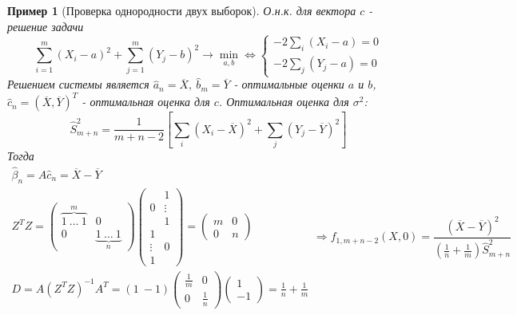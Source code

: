 \documentclass[12pt]{article}
\newtheorem*{example}{Пример}
\theoremstyle{basic_theorem}
\theoremstyle{name_theorem}
\begin{document}
\begin{example}[Проверка однородности двух выборок]
    О.н.к. для вектора $c$ - решение задачи
    \[
        \sum_{i=1}^m(X_i-a)^2+\sum_{j=1}^m(Y_j-b)^2\rightarrow \min_{a, b}
        \Leftrightarrow \begin{cases}
            -2\sum_i(X_i-a) = 0 \\
            -2\sum_j(Y_j-a) = 0
        \end{cases}
    \]
    Решением системы является $\widehat{a}_n=\overline{X},\ \widehat{b}_m=\overline{Y}$ -
    оптимальные оценки $a$ и $b$, $\widehat{c}_n=(\overline{X}, \overline{Y})^T$ - оптимальная
    оценка для $c$. Оптимальная оценка для $\sigma^2$:
    \[ \widehat{S}^2_{m+n}=\frac{1}{m+n-2}\left[\sum_i(X_i-\overline{X})^2+\sum_j(Y_j-\overline{Y})^2\right] \]
    Тогда
    \[
    \begin{array}{l}
        \widehat{\beta}_n=A\widehat{c}_n=\overline{X}-\overline{Y} \\
        Z^TZ=\left(\begin{array}{cc}
            \overbrace{1\ \ldots\ 1}^m & 0 \\
                  0      & \underbrace{1\ \ldots\ 1}_n
        \end{array}\right)
        \left(\begin{array}{cc}
              & 1 \\
            0 & \vdots \\
              & 1 \\
            1  & \\
            \vdots & 0 \\
            1  &
        \end{array}\right) = \left(\begin{array}{cc}
            m & 0 \\
            0 & n
        \end{array}\right) \\
        D=A(Z^TZ)^{-1}A^T=
        \left(1\ -1 \right)
        \left(\begin{array}{cc}
            \frac{1}{m} & 0 \\
            0 & \frac{1}{n}
        \end{array}\right)
        \left(\begin{array}{c}
            1 \\
            -1
        \end{array}\right) = \frac{1}{n} + \frac{1}{m}
    \end{array}
    \Rightarrow
    \boxed{f_{1, m+n-2}(X,0)=\frac{(\overline{X}-\overline{Y})^2}{\left(\frac{1}{n} + \frac{1}{m}\right)\widehat{S}^2_{m+n}}}
\]
\end{example}
\end{document}
